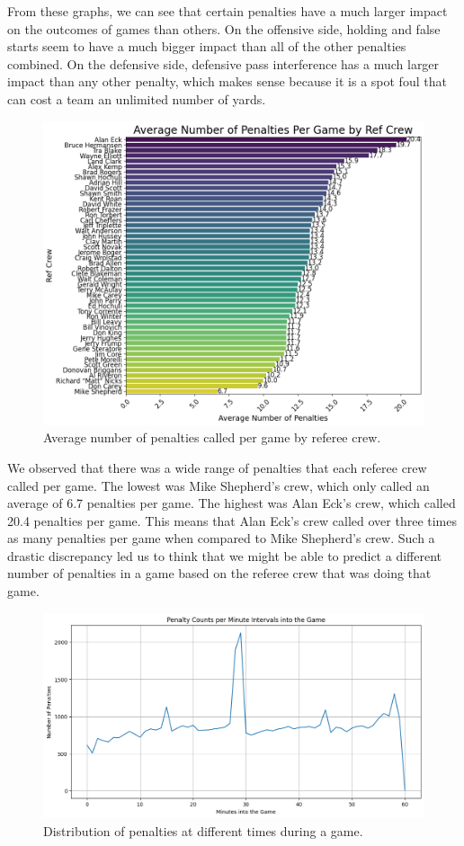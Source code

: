 \documentclass[sigconf, nonacm]{acmart}
\begin{document}
From these graphs, we can see that certain penalties have a much larger impact
on the outcomes of games than others. On the offensive side, holding and false
starts seem to have a much bigger impact than all of the other penalties
combined. On the defensive side, defensive pass interference has a much larger
impact than any other penalty, which makes sense because it is a spot foul that
can cost a team an unlimited number of yards.

\begin{figure}[h]                                                               
  \centering
  \includegraphics[width=\linewidth]{images/eda_1.png}
  \caption{Average number of penalties called per game by referee crew.}
\end{figure}

We observed that there was a wide range of penalties that each referee crew
called per game. The lowest was Mike Shepherd's crew, which only called an 
average of 6.7 penalties per game. The highest was Alan Eck's crew, which called
20.4 penalties per game. This means that Alan Eck's crew called over three times
as many penalties per game when compared to Mike Shepherd's crew. Such a drastic
discrepancy led us to think that we might be able to predict a different number
of penalties in a game based on the referee crew that was doing that game.

\begin{figure}[h]
  \centering
  \includegraphics[width=\linewidth]{images/eda_2.png}
  \caption{Distribution of penalties at different times during a game.}
\end{figure}
\end{document}
